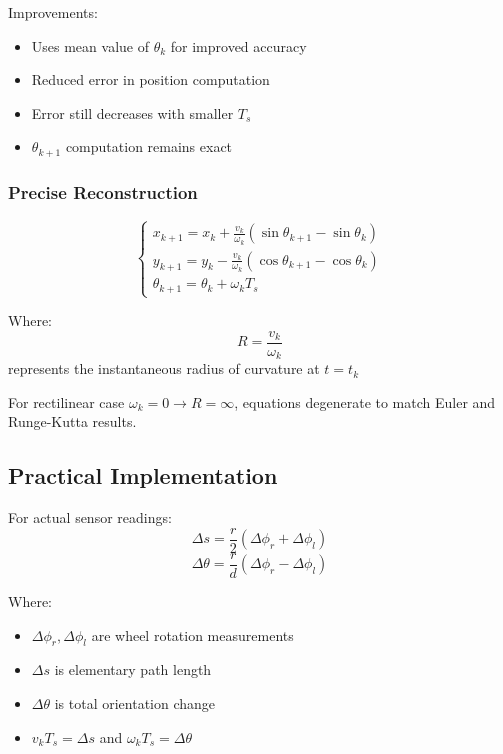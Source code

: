 \documentclass[openany]{book}
\theoremstyle{definition}
\theoremstyle{remark}
\newcommand{\note}[1]{
\begin{tcolorbox}[colback=green!5,colframe=green!40!black,title=Note]
 #1
\end{tcolorbox}
}
\begin{document}
Improvements:
\begin{itemize}
   \item Uses mean value of $\theta_k$ for improved accuracy
   \item Reduced error in position computation
   \item Error still decreases with smaller $T_s$
   \item $\theta_{k+1}$ computation remains exact
\end{itemize}

\subsubsection{Precise Reconstruction}
\begin{equation}
\begin{cases}
x_{k+1} = x_k + \frac{v_k}{\omega_k}(\sin \theta_{k+1} - \sin \theta_k) \\
y_{k+1} = y_k - \frac{v_k}{\omega_k}(\cos \theta_{k+1} - \cos \theta_k) \\
\theta_{k+1} = \theta_k + \omega_k T_s
\end{cases}
\end{equation}

Where:
\begin{equation}
R = \frac{v_k}{\omega_k}
\end{equation}
represents the instantaneous radius of curvature at $t = t_k$

\note{For rectilinear case $\omega_k = 0 \rightarrow R = \infty$, equations degenerate to match Euler and Runge-Kutta results.}

\subsection{Practical Implementation}
For actual sensor readings:
\begin{equation}
\Delta s = \frac{r}{2}(\Delta \phi_r + \Delta \phi_l)
\end{equation}
\begin{equation}
\Delta \theta = \frac{r}{d}(\Delta \phi_r - \Delta \phi_l)
\end{equation}

Where:
\begin{itemize}
   \item $\Delta \phi_r, \Delta \phi_l$ are wheel rotation measurements
   \item $\Delta s$ is elementary path length
   \item $\Delta \theta$ is total orientation change
   \item $v_k T_s = \Delta s$ and $\omega_k T_s = \Delta \theta$
\end{itemize}
\end{document}
